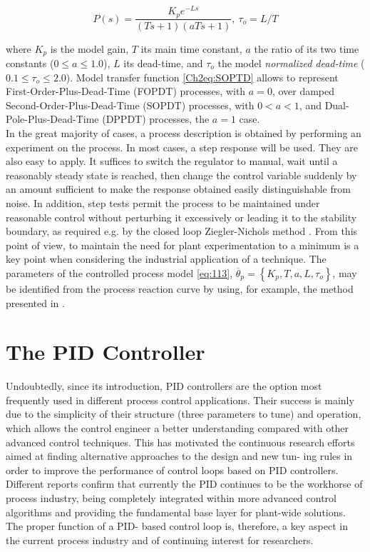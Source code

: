 \begin{equation}
    P(s) = \frac{K_p e^{-Ls}}{(Ts+1)(aTs+1)}, \ \tau_o = L/T 
    \label{Ch2eq:SOPTD}
\end{equation}

\noindent where $K_p$ is the model gain, $T$ its main time constant, $a$ the ratio of its two time constants ($0 \leq a \leq 1.0$), $L$ its dead-time, and $\tau_o$ the model \emph{normalized dead-time} ($0.1 \leq \tau_o \leq 2.0$). Model transfer function \eqref{Ch2eq:SOPTD} allows to represent First-Order-Plus-Dead-Time (FOPDT) processes, with $a=0$, over damped Second-Order-Plus-Dead-Time (SOPDT) processes, with $0 < a < 1$, and Dual-Pole-Plus-Dead-Time (DPPDT) processes, the $a=1$ case.\\

In the great majority of cases, a process description is obtained by performing an experiment on the process. In most cases, a step response will be used. They are also easy to apply. It suffices to switch the regulator to manual, wait until a reasonably steady state is reached, then change the control variable suddenly by an amount sufficient to make the response obtained easily distinguishable from noise. In addition, step tests permit the process to be maintained under reasonable control without perturbing it excessively or leading it to the stability boundary, as required e.g. by the closed loop Ziegler-Nichols method \cite{astromhagglund2006}. From this point of view, to maintain the need for plant experimentation to a minimum is a key point when considering the industrial application of a technique. The parameters of the controlled process model \eqref{eq:113}, $\overline{\theta}_p = \left\{K_p, T, a, L, \tau_o \right\}$, may be identified from the process reaction curve by using, for example, the method presented in \cite{alfaro2006-1}. 



\section{The PID Controller}
\label{sec:3}
Undoubtedly, since its introduction, PID controllers are the option most frequently used in different process control applications. Their success is mainly due to the simplicity of their structure (three parameters to tune) and operation, which allows the control engineer a better understanding compared with other advanced control techniques. This has motivated the continuous research efforts aimed at finding alternative approaches to the design and new tun- ing rules in order to improve the performance of control loops based on PID controllers. Different reports confirm that currently the PID continues to be the workhorse of process industry, being completely integrated within more advanced control algorithms and providing the fundamental base layer for plant-wide solutions. The proper function of a PID- based control loop is, therefore, a key aspect in the current process industry and of continuing interest for researchers.\\

